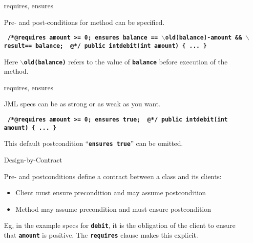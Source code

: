 \documentclass[
pdf,
nocolorBG,
slideColor,
erik,
]{prosper}
\newcommand{\code}[1]{{\rm \texttt{\textbf{\small #1}}}}
\newcommand{\old}     {\(\backslash\)old}
\newcommand{\result}  {\(\backslash\)result}
\begin{document}
\begin{slide}{requires, ensures}
\vspace*{-3ex}

{\blue Pre-} and {\blue post-conditions} for method can be specified.

\begin{alltt}
\texttt{\textbf{\small
{\green /*@}{\blue requires} amount >= 0;
    {\blue ensures}  balance == \old(balance)-amount &&
              \result == balance;
{ \green  @*/}
  public int{\green debit}(int amount) \{ 
    ...
  \}
}}
\end{alltt}

Here \code{\old(balance)} refers to the value of \code{balance}
before execution of the method.

\end{slide}
\begin{slide}{requires, ensures}
\vspace*{-3ex}

JML specs can be as strong or as weak as you want.

\begin{alltt}
\texttt{\textbf{\small
{\green /*@}{\blue requires} amount >= 0;
    {\blue ensures} {\blue true};
{ \green  @*/}
  public int{\green debit}(int amount) \{ 
    ...
  \}
}}
\end{alltt}

This default postcondition ``\code{ensures true}'' can be omitted.

\end{slide}

\begin{slide}{Design-by-Contract}
\vspace*{-3ex}

Pre- and postconditions define a {\blue contract} between a class and
its clients:
\medskip
\begin{itemize}
\item
Client must {\green ensure precondition}
and may {\green assume postcondition}
\item
Method may {\green assume precondition}
and must {\green ensure postcondition}
\end{itemize}

\bigskip

Eg, in the example specs for \code{debit}, it is the obligation of the
client to ensure that \code{amount} is positive.  The \code{requires}
clause makes this {\green explicit}.

\end{slide}
\end{document}

